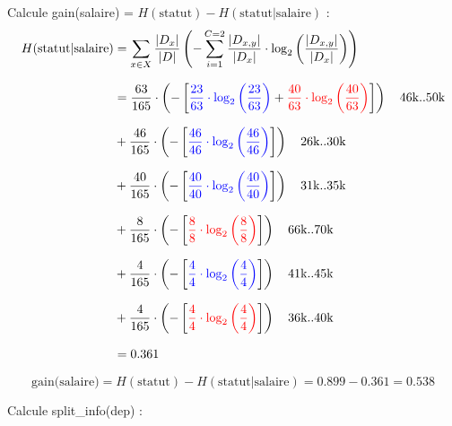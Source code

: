 \documentclass{article}
\begin{document}
Calcule gain(salaire) = $H(\text{statut}) - H(\text{statut} | \text{salaire})$ :
\begin{align*}
    H(\text{statut} | \text{salaire}) &= \sum_{x\in X} \dfrac{|D_x|}{|D|} \left( - \sum_{i=1} ^{C=2} \dfrac{|D_{x,y}|}{|D_x|} \cdot \log_2 \left( \dfrac{|D_{x,y}|}{|D_x|} \right) \right)\\[0.25cm]
                                  &= \dfrac{63}{165} \cdot \left( - \left[ \textcolor{blue}{\dfrac{23}{63} \cdot \log_2\left (\dfrac{23}{63} \right)} +   \textcolor{red}{\dfrac{40}{63} \cdot \log_2\left (\dfrac{40}{63} \right)} \right]  \right) \quad \text{46k..50k}\\[0.25cm]
                                  &+ \dfrac{46}{165} \cdot \left( - \left[ \textcolor{blue}{\dfrac{46}{46} \cdot \log_2\left (\dfrac{46}{46} \right)}  \right]  \right) \quad \text{26k..30k}\\[0.25cm]
                                  &+ \dfrac{40}{165} \cdot \left( - \left[ \textcolor{blue}{\dfrac{40}{40} \cdot \log_2\left (\dfrac{40}{40} \right)}  \right]  \right) \quad \text{31k..35k}\\[0.25cm]
                                  &+ \dfrac{8}{165} \cdot \left( - \left[ \textcolor{red}{\dfrac{8}{8} \cdot \log_2\left (\dfrac{8}{8} \right)}  \right]  \right) \quad \text{66k..70k}\\[0.25cm]
                                  &+ \dfrac{4}{165} \cdot \left( - \left[ \textcolor{blue}{\dfrac{4}{4} \cdot \log_2\left (\dfrac{4}{4} \right)}  \right]  \right) \quad \text{41k..45k}\\[0.25cm]
                                  &+ \dfrac{4}{165} \cdot \left( - \left[ \textcolor{red}{\dfrac{4}{4} \cdot \log_2\left (\dfrac{4}{4} \right)}  \right]  \right) \quad \text{36k..40k}\\[0.25cm]
                                  & = 0.361
\end{align*}


\vspace{-0.15cm}

\[\text{gain(salaire)} = H(\text{statut}) - H(\text{statut} | \text{salaire}) = 0.899 - 0.361 = 0.538\]

\vspace{1.15cm}

Calcule split\_info(dep) :
\end{document}
